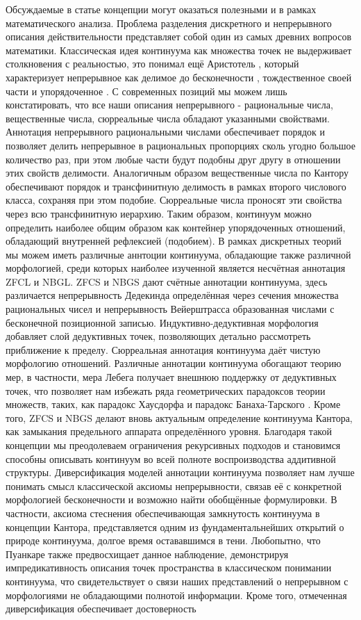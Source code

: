 \documentclass[12pt]{article}
\begin{document}
Обсуждаемые в статье концепции могут оказаться полезными и в рамках математического анализа. Проблема разделения дискретного и непрерывного описания действительности представляет собой один из самых древних вопросов математики. Классическая идея континуума как множества точек не выдерживает столкновения с реальностью, это понимал ещё Аристотель \cite{aristotle-pointless-continuum}, который характеризует непрерывное как делимое до бесконечности \cite{aristotle-countinuum-divisibility}, тождественное своей части и упорядоченное \cite{aristotle-countinuum-similarity}. С современных позиций мы можем лишь констатировать, что все наши описания непрерывного - рациональные числа, вещественные числа, сюрреальные числа обладают указанными свойствами. Аннотация непрерывного рациональными числами обеспечивает порядок и позволяет делить непрерывное в рациональных пропорциях сколь угодно большое количество раз, при этом любые части будут подобны друг другу в отношении этих свойств делимости. Аналогичным образом вещественные числа по Кантору обеспечивают порядок и трансфинитную делимость в рамках второго числового класса, сохраняя при этом подобие. Сюрреальные числа проносят эти свойства через всю трансфинитную иерархию. Таким образом, континуум можно определить наиболее общим образом как контейнер упорядоченных отношений, обладающий внутренней рефлексией (подобием). В рамках дискретных теорий мы можем иметь различные аннтоции континуума, обладающие также различной морфологией, среди которых наиболее изученной является несчётная аннотация ZFCL и NBGL. ZFCS и NBGS дают счётные аннотации континуума, здесь различается непрерывность Дедекинда определённая через сечения множества рациональных чисел и непрерывность Вейерштрасса образованная числами с бесконечной позиционной записью. Индуктивно-дедуктивная морфология добавляет слой дедуктивных точек, позволяющих детально рассмотреть приближение к пределу. Сюрреальная аннотация континуума даёт чистую морфологию отношений. Различные аннотации континуума обогащают теорию мер, в частности, мера Лебега получает внешнюю поддержку от дедуктивных точек, что позволяет нам избежать ряда геометрических парадоксов теории множеств, таких, как парадокс Хаусдорфа \cite{hausdorff} и парадокс Банаха-Тарского \cite{banach-tarski}. Кроме того, ZFCS и NBGS делают вновь актуальным определение континуума Кантора, как замыкания предельного аппарата определённого уровня. Благодаря такой концепции мы преодолеваем ограничения рекурсивных подходов и становимся способны описывать континуум во всей полноте воспроизводства аддитивной структуры. Диверсификация моделей аннотации континуума позволяет нам лучше понимать смысл классической аксиомы непрерывности, связав её с конкретной морфологией бесконечности и возможно найти обобщённые формулировки. В частности, аксиома стеснения обеспечивающая замкнутость континуума в концепции Кантора, представляется одним из фундаментальнейших открытий о природе континуума, долгое время остававшимся в тени. Любопытно, что Пуанкаре также предвосхищает данное наблюдение, демонстрируя импредикативность описания точек пространства в классическом понимании континуума, что свидетельствует о связи наших представлений о непрерывном с морфологиями не обладающими полнотой информации. Кроме того, отмеченная диверсификация обеспечивает достоверность 
\end{document}
